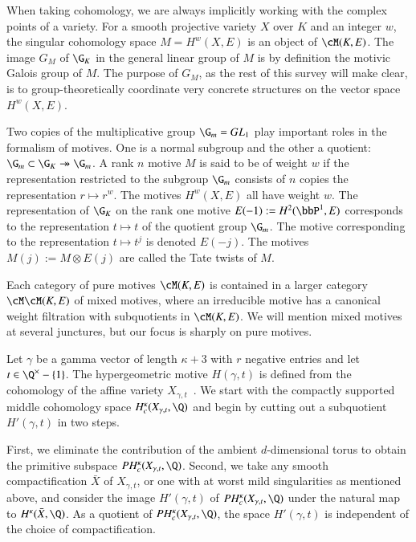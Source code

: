 \documentclass{notices}
\numberwithin{equation}{section}
\numberwithin{table}{section}
\numberwithin{figure}{section}
\begin{document}
{When taking cohomology, we are always implicitly
working with the complex points of a variety.  
For a smooth projective
variety $X$ over $K$ and an integer $w$, 
the singular cohomology space $M=H^w(X,E)$ 
is an object of $\cM(K,E)$.  The image $G_M$
of $\G_K$ in the general linear group
of $M$ is by definition the motivic Galois group of $M$.  
The purpose of $G_M$, as the rest of this survey will
make clear, is to group-theoretically coordinate
very concrete structures on the vector space
$H^w(X,E)$.

Two copies of the multiplicative group $\G_m = GL_1$
play important roles in the formalism 
of motives.    One is a normal subgroup and the 
other a quotient: $\G_m \subset \G_K \twoheadrightarrow \G_m$.
A rank $n$ motive $M$ is said to be of weight
$w$ if the representation restricted to 
the subgroup $\G_m$ consists of $n$ copies the 
representation $r \mapsto r^w$.   The motives
$H^w(X,E)$ all have weight $w$.  
The representation of $\G_K$ on the rank one motive $E(-1) := H^2(\bbP^1,E)$ 
corresponds to the representation $t \mapsto t$
of the quotient group $\G_m$.   The motive corresponding
to the representation $t \mapsto t^j$ is denoted $E(-j)$.  
The motives $M(j) := M \otimes E(j)$ are called the 
Tate twists of $M$. 

Each category of pure motives $\cM(K,E)$ is contained 
in a larger category $\cM \cM(K,E)$ of mixed motives, 
where an irreducible motive has a canonical weight filtration 
with subquotients in $\cM(K,E)$.  We will 
mention mixed motives at several junctures, 
but our focus is sharply on pure motives.  


  Let $\gamma$ be a gamma vector
  of length $\kappa+3$ with $r$ negative entries and let
  $t \in \Q^\times-\{1\}$. The hypergeometric motive $H(\gamma,t)$ is
  defined from the cohomology of the affine variety
  $X_{\gamma,t}$~\cite{RV-Mixed}.  We start with the compactly supported middle cohomology space
  $H_c^\kappa(X_{\gamma,t},\Q)$ and begin by cutting out a subquotient $H'(\gamma,t)$ in two steps.

First, we eliminate the contribution of the ambient $d$-dimensional torus to
obtain the primitive subspace $PH_c^\kappa(X_{\gamma,t},\Q)$.
Second, we take any smooth compactification $\bar X$ of $X_{\gamma,t}$, or one with at worst 
mild singularities as mentioned above, and
consider the image $H'(\gamma,t)$ of $PH_c^\kappa(X_{\gamma,t},\Q)$ under the
natural map to $H^\kappa(\bar{X},\Q)$.  As a quotient of $PH_c^\kappa(X_{\gamma,t},\Q)$, the space
$H'(\gamma,t)$ is independent of the choice of compactification.

}
\end{document}
